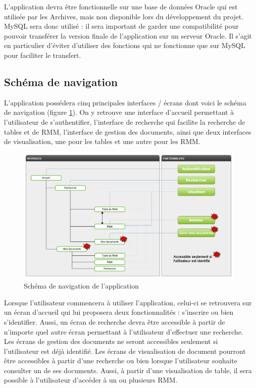 \documentclass[a4paper]{article}
\begin{document}
L'application devra être fonctionnelle sur une base de données Oracle qui est utilisée par les Archives, mais non disponible lors du développement du projet. MySQL sera donc utilisé : il sera important de garder une compatibilité pour pouvoir transférer la version finale de l'application sur un serveur Oracle. Il s'agit en particulier d'éviter d'utiliser des fonctions qui ne fonctionne que sur MySQL pour faciliter le transfert.

\subsection{Schéma de navigation}

L’application possédera cinq principales interfaces / écrans dont voici le schéma de navigation (figure \ref{fig:navigation}). On y retrouve une interface d'accueil permettant à l'utilisateur de s'authentifier, l'interface de recherche qui facilite la recherche de tables et de RMM, l'interface de gestion des documents, ainsi que deux interfaces de visualisation, une pour les tables et une autre pour les RMM.

\begin{figure}[H]
\centering
\includegraphics[width=\textwidth]{navigation.png}
\caption{Schéma de navigation de l'application}
\label{fig:navigation}
\end{figure}

Lorsque l’utilisateur commencera à utiliser l’application, celui-ci se retrouvera sur un écran d’accueil qui lui proposera deux fonctionnalités : s'inscrire ou bien s’identifier. Aussi, un écran de recherche devra être accessible à partir de n’importe quel autre écran permettant à l'utilisateur d'effectuer une recherche. Les écrans de gestion des documents ne seront accessibles seulement si l’utilisateur est déjà identifié. Les écrans de visualisation de document pourront être accessibles à partir d’une recherche ou bien lorsque l’utilisateur souhaite consulter un de ses documents. Aussi, à partir d’une visualisation de table, il sera possible à l’utilisateur d’accéder à un ou plusieurs RMM.
\end{document}
